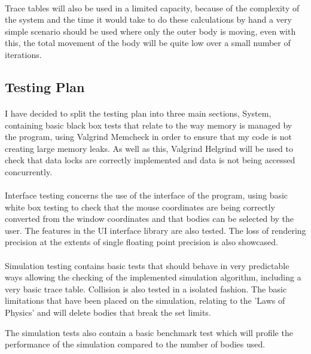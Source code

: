 \paragraph{}
Trace tables will also be used in a limited capacity, because of the complexity of the system and the time it would take to do these calculations by hand a very simple scenario should be used where only the outer body is moving, even with this, the total movement of the body will be quite low over a small number of iterations.

\pagebreak
\subsection{Testing Plan}
\paragraph{}
I have decided to split the testing plan into three main sections, System, containing basic black box tests that relate to the way memory is managed by the program, using Valgrind Memcheck in order to ensure that my code is not creating large memory leaks. As well as this, Valgrind Helgrind will be used to check that data locks are correctly implemented and data is not being accessed concurrently.

\paragraph{}
Interface testing concerns the use of the interface of the program, using basic white box testing to check that the mouse coordinates are being correctly converted from the window coordinates and that bodies can be selected by the user. The features in the UI interface library are also tested. The loss of rendering precision at the extents of single floating point precision is also showcased.

\paragraph{}
Simulation testing contains basic tests that should behave in very predictable ways allowing the checking of the implemented simulation algorithm, including a very basic trace table. Collision is also tested in a isolated fashion. The basic limitations that have been placed on the simulation, relating to the 'Laws of Physics' and will delete bodies that break the set limits.

The simulation tests also contain a basic benchmark test which will profile the performance of the simulation compared to the number of bodies used.

